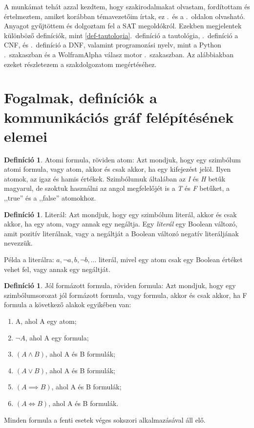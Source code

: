 \documentclass[
]{thesis-ekf}
\theoremstyle{definition}
\newtheorem{definicio}[tetel]{Definíció}
\theoremstyle{remark}
\begin{document}
	A munkámat tehát azzal kezdtem, hogy szakirodalmakat olvastam, fordítottam és értelmeztem, amiket korábban témavezetőim írtak, ez \az{\pageref{ssec-szakirodalom}}.~és a \az{\pageref{sec-szakirodalom-forditas}}.~oldalon olvasható.
	Anyagot gyűjtöttem és dolgoztam fel a \textsc{SAT} megoldókról.
	Ezekben megjelentek különböző definíciók, mint \ref{def-tautologia}.~definíció a tautológia, \az{\ref{def-cnf}}.~definíció a \textsc{CNF}, és \az{\ref{def-dnf}}.~definíció a \textsc{DNF}, valamint programozási nyelv, mint a Python \az{\ref{kif-python-programnyelv}}.~szakaszban és a WolframAlpha válasz motor \az{\ref{kif-wolframalpha-hasznalata}}.~szakaszban. Az alábbiakban ezeket részletezem a szakdolgozatom megértéséhez.
		
	\section{Fogalmak, definíciók a kommunikációs gráf felépítésének elemei}\label{sec-alap-fogalmak}
	
	\begin{definicio}
		Atomi formula, röviden atom: Azt mondjuk, hogy egy szimbólum atomi formula, vagy atom, akkor és csak akkor, ha egy kifejezést jelöl. Ilyen atomok, az igaz és hamis értékek. Szimbólumuk általában az \emph{I} és \emph{H} betűk magyarul, de szoktuk használni az angol megfelelőjét is a \emph{T} és \emph{F} betűket, a ,,true'' és a ,,false'' atomokhoz.
	\end{definicio}

	\begin{definicio}
		Literál: Azt mondjuk, hogy egy szimbólum literál, akkor és csak akkor, ha egy atom, vagy annak egy negáltja.
		Egy \emph{literál} egy Boolean változó, amit pozitív literálnak, vagy a negáltját a Boolean változó negatív literáljának nevezzük. 
	\end{definicio}

	Példa a literálra: $ a,\neg a,b,\neg b,\dots $ literál, mivel egy atom csak egy Boolean értéket vehet fel, vagy annak egy negáltját.
	

	\begin{definicio}		
		Jól formázott formula, röviden formula: Azt mondjuk, hogy egy szimbólumsorozat jól formázott formula, vagy formula, akkor és csak akkor, ha F formula a következő alakok egyikében van:
		\begin{enumerate}[label=\textit{(\alph*)}]
			\item A, ahol A egy atom;
			\item $ \neg A $, ahol A egy formula;
			\item $ (A \wedge B) $, ahol A és B formulák;
			\item $ (A \vee B) $, ahol A és B formulák;
			\item $ (A \implies B) $, ahol A és B formulák;
			\item $ (A \Leftrightarrow B) $, ahol A és B formulák.
		\end{enumerate}
		Minden formula a fenti esetek véges sokszori alkalmazásával áll elő.
	\end{definicio}
\end{document}

